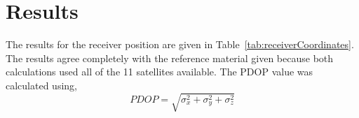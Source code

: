 
\section{Results} %
\label{sec:results}

The results for the receiver position are given in Table~\ref{tab:receiverCoordinates}.  The results agree completely with the reference material given because both calculations used all of the 11 satellites available.  The PDOP value was calculated using,
\begin{equation*}
	PDOP = \sqrt{\sigma_x^2 + \sigma_y^2 + \sigma_z^2}
\end{equation*}
% 
